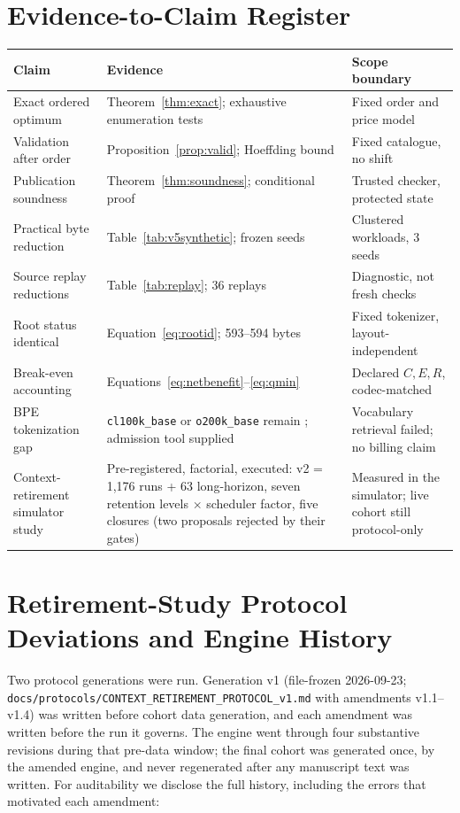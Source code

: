 \section{Evidence-to-Claim Register}\label{app:register}
\begin{center}\small
\begin{tabularx}{\linewidth}{@{}p{.30\linewidth}Xp{.22\linewidth}@{}}\toprule
Claim & Evidence & Scope boundary\\\midrule
Exact ordered optimum & Theorem~\ref{thm:exact}; exhaustive enumeration tests & Fixed order and price model\\
Validation after order & Proposition~\ref{prop:valid}; Hoeffding bound & Fixed catalogue, no shift\\
Publication soundness & Theorem~\ref{thm:soundness}; conditional proof & Trusted checker, protected state\\
Practical byte reduction & Table~\ref{tab:v5synthetic}; frozen seeds & Clustered workloads, 3 seeds\\
Source replay reductions & Table~\ref{tab:replay}; 36 replays & Diagnostic, not fresh checks\\
Root status identical & Equation~\eqref{eq:rootid}; 593--594 bytes & Fixed tokenizer, layout-independent\\
Break-even accounting & Equations~\eqref{eq:netbenefit}--\eqref{eq:qmin} & Declared $C,E,R$, codec-matched\\
BPE tokenization gap & \texttt{cl100k\_base} or \texttt{o200k\_base} remain \UNKNOWN{}; admission tool supplied & Vocabulary retrieval failed; no billing claim\\
Context-retirement simulator study & Pre-registered, factorial, executed: v2 = 1{,}176 runs + 63 long-horizon, seven retention levels $\times$ scheduler factor, five closures (two proposals rejected by their gates) & Measured in the simulator; live cohort still protocol-only\\
\bottomrule\end{tabularx}\end{center}

\section{Retirement-Study Protocol Deviations and Engine History}\label{app:retire-deviations}
Two protocol generations were run. Generation v1 (file-frozen
2026-09-23; \texttt{docs/\allowbreak protocols/\allowbreak CONTEXT\_\allowbreak RETIREMENT\_\allowbreak PROTOCOL\_\allowbreak v1.md}
with amendments v1.1--v1.4) was written before cohort data generation, and
each amendment was written before the run it governs. The engine went
through four substantive revisions during that pre-data window; the
final cohort was generated once, by the amended engine, and never
regenerated after any manuscript text was written. For auditability we
disclose the full history, including the errors that motivated each
amendment:

